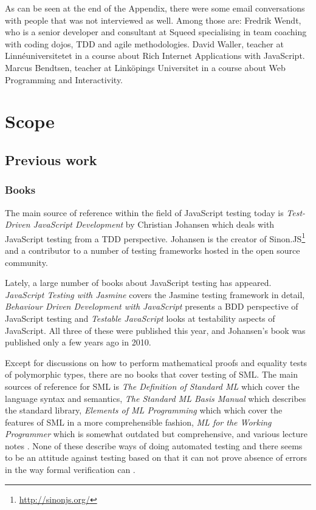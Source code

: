 \documentclass[11pt]{article}
\begin{document}
As can be seen at the end of the Appendix, there were some email conversations with people that was not interviewed as well. Among those are: Fredrik Wendt, who is a senior developer and consultant at Squeed specialising in team coaching with coding dojos, TDD and agile methodologies. David Waller, teacher at Linnéuniversitetet in a course about Rich Internet Applications with JavaScript. Marcus Bendtsen, teacher at Linköpings Universitet in a course about Web Programming and Interactivity.

\section{Scope}

\subsection{Previous work}

\subsubsection{Books}

The main source of reference within the field of JavaScript testing today is \emph{Test-Driven JavaScript Development} \cite{Tddjs} by Christian Johansen which deals with JavaScript testing from a TDD perspective. Johansen is the creator of Sinon.JS\footnote{\url{http://sinonjs.org/}} and a contributor to a number of testing frameworks hosted in the open source community.

Lately, a large number of books about JavaScript testing has appeared. \emph{JavaScript Testing with Jasmine} \cite{JasmineBook} covers the Jasmine testing framework in detail, \emph{Behaviour Driven Development with JavaScript} \cite{BDDJS} presents a BDD perspective of JavaScript testing and \emph{Testable JavaScript} \cite{TestableJS} looks at testability aspects of JavaScript. All three of these were published this year, and Johansen's book was published only a few years ago in 2010.

Except for discussions on how to perform mathematical proofs and equality tests of polymorphic types, there are no books that cover testing of SML. The main sources of reference for SML is \emph{The Definition of Standard ML} \cite{DefinitionStandardML} which cover the language syntax and semantics, \emph{The Standard ML Basis Manual} \cite{BasisManual} which describes the standard library, \emph{Elements of ML Programming} which \cite{ElementsML} which cover the features of SML in a more comprehensible fashion, \emph{ML for the Working Programmer} \cite{WorkingProgrammer} which is somewhat outdated but comprehensive, and various lecture notes \cite{ProgSml97}\cite{ProgSmlHarper}\cite{FunctionalML}\cite{NotesSMLNJ}. None of these describe ways of doing automated testing and there seems to be an attitude against testing based on that it can not prove absence of errors in the way formal verification can \cite[p.~16]{ProgSmlHarper}.
\end{document}
